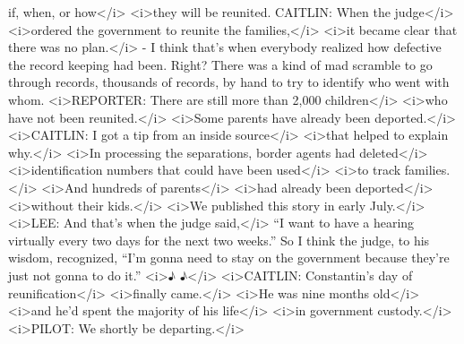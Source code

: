 \begin{itemize}
\begin{itemize}
    if, when, or how\textless{}/i\textgreater{}
    \textless{}i\textgreater{}they will be reunited. CAITLIN: When the
    judge\textless{}/i\textgreater{} \textless{}i\textgreater{}ordered
    the government to reunite the families,\textless{}/i\textgreater{}
    \textless{}i\textgreater{}it became clear that there was no
    plan.\textless{}/i\textgreater{} - I think that's when everybody
    realized how defective the record keeping had been. Right? There was
    a kind of mad scramble to go through records, thousands of records,
    by hand to try to identify who went with whom.
    \textless{}i\textgreater{}REPORTER: There are still more than 2,000
    children\textless{}/i\textgreater{} \textless{}i\textgreater{}who
    have not been reunited.\textless{}/i\textgreater{}
    \textless{}i\textgreater{}Some parents have already been
    deported.\textless{}/i\textgreater{}
    \textless{}i\textgreater{}CAITLIN: I got a tip from an inside
    source\textless{}/i\textgreater{} \textless{}i\textgreater{}that
    helped to explain why.\textless{}/i\textgreater{}
    \textless{}i\textgreater{}In processing the separations, border
    agents had deleted\textless{}/i\textgreater{}
    \textless{}i\textgreater{}identification numbers that could have
    been used\textless{}/i\textgreater{} \textless{}i\textgreater{}to
    track families.\textless{}/i\textgreater{}
    \textless{}i\textgreater{}And hundreds of
    parents\textless{}/i\textgreater{} \textless{}i\textgreater{}had
    already been deported\textless{}/i\textgreater{}
    \textless{}i\textgreater{}without their
    kids.\textless{}/i\textgreater{} \textless{}i\textgreater{}We
    published this story in early July.\textless{}/i\textgreater{}
    \textless{}i\textgreater{}LEE: And that's when the judge
    said,\textless{}/i\textgreater{} ``I want to have a hearing
    virtually every two days for the next two weeks.'' So I think the
    judge, to his wisdom, recognized, ``I'm gonna need to stay on the
    government because they're just not gonna to do it.''
    \textless{}i\textgreater{}♪ ♪\textless{}/i\textgreater{}
    \textless{}i\textgreater{}CAITLIN: Constantin's day of
    reunification\textless{}/i\textgreater{}
    \textless{}i\textgreater{}finally came.\textless{}/i\textgreater{}
    \textless{}i\textgreater{}He was nine months
    old\textless{}/i\textgreater{} \textless{}i\textgreater{}and he'd
    spent the majority of his life\textless{}/i\textgreater{}
    \textless{}i\textgreater{}in government
    custody.\textless{}/i\textgreater{} \textless{}i\textgreater{}PILOT:
    We shortly be departing.\textless{}/i\textgreater{}

\end{itemize}
\end{itemize}
